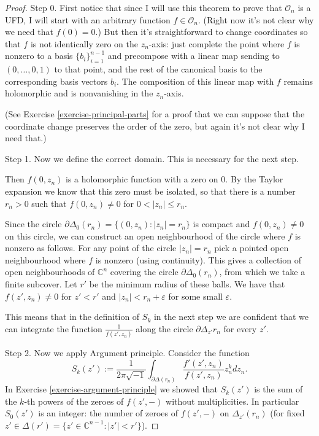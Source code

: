 \begin{proof}
Step 0. First notice that since I will use
this theorem
to prove that $\mathcal{O}_n$ is a UFD, I
will start with
an arbitrary function $f \in \mathcal{O}_n$.
(Right now it's not clear why we need that
$f(0)=0$.)
But then it's straightforward to change
coordinates so that $f$
is not identically zero on the  $z_n$-axis:
just complete the point where $f$ is nonzero
to a basis $\{b_i\}_{i=1}^{n-1}$
and precompose with a linear map sending to
$(0,\ldots,0,1)$
to that point, and the rest of the canonical
basis
to the corresponding basis vectors $b_i$.
The composition of this linear map with $f$
remains holomorphic
and is nonvanishing in the $z_n$-axis.

(See Exercise \ref{exercise-principal-parts}
for a proof that we can suppose
that the coordinate change preserves the
order of the zero,
but again it's not clear why I need that.)

\medskip\noindent
Step 1. Now we define the correct domain.
This is necessary for the next step.

Then $f(0,z_n)$ is a holomorphic function
with a zero on $0$. By
the Taylor expansion we know that this zero
must be isolated, so that there is a
number $r_n>0$ such that $f(0,z_n)\neq 0$ for
$0<|z_n|\leq r_n$.

Since the circle
$\partial\Delta_0(r_n)=\{(0,z_n):|z_n|=r_n\}$
is compact
and $f(0,z_n)\neq 0$ on this circle, we can
construct
an open neighbourhood of the circle where $f$
is nonzero as follows.
For any point of the circle $|z_n|=r_n$
pick a pointed open neighbourhood where $f$
is nonzero (using continuity).
This gives a collection of open
neighbourhoods of $\mathbb{C}^n$
covering the circle
$\partial\Delta_{0}(r_n)$,
from which we take a finite subcover.
Let $r'$ be the minimum radius of these
balls.
We have that $f(z',z_n)\neq 0$ for $z'<r'$
and  $|z_n|<r_n+\varepsilon$
for some small $\varepsilon$.

This means that in the definition of $S_k$ in
the next
step we are confident that we can integrate
the function
$\frac{1}{f(z',z_n)}$ along the circle
$\partial\Delta_{z'}r_n$
for every $z'$.

\medskip\noindent
Step 2. Now we apply Argument principle.
Consider the function
$$
S_k(z'):=\frac{1}{2\pi\sqrt{-1}}
\int_{\partial\Delta(r_n)}
\frac{f'(z',z_n)}{f(z',z_n)}z_n^kdz_n.
$$
In Exercise \ref{exercise-argument-principle}
we showed that $S_k(z')$ is the sum of the
$k$-th powers of
the zeroes of  $f(z',-)$ without
multiplicities.
In particular
$S_0(z')$ is an integer: the number of
zeroes of $f(z',-)$ on $\Delta_{z'}(r_n)$
(for fixed
$z' \in \Delta(r')=\{z' \in
\mathbb{C}^{n-1}:|z'|<r'\}$).


\end{proof}
